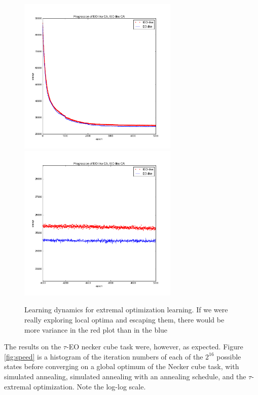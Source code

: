 \documentclass[12pt]{article}
\begin{document}
\begin{figure}
  \includegraphics[width=3in]{eo_rbm_unzoomed}
  \includegraphics[width=3in]{eo_rbm_zoomed}
  \caption{Learning dynamics for extremal optimization learning. If we were really exploring local optima and escaping them, there would be more variance in the red plot than in the blue}
\end{figure}

The results on the $\tau$-EO necker cube task were, however, as expected. Figure \ref{fig:speed} is a histogram of the iteration numbers of each of the $2^16$ possible states before converging on a global optimum of the Necker cube task, with simulated annealing, simulated annealing with an annealing schedule, and the $\tau$-extremal optimization. Note the log-log scale.
\end{document}

